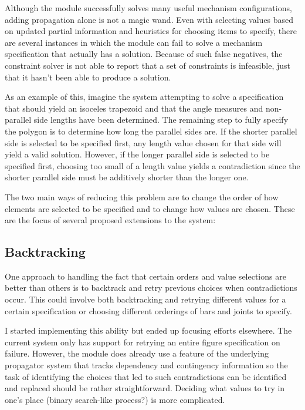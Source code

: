 Although the module successfully solves many useful mechanism
configurations, adding propagation alone is not a magic wand. Even
with selecting values based on updated partial information and
heuristics for choosing items to specify, there are several instances
in which the module can fail to solve a mechanism specification that
actually has a solution. Because of such false negatives, the
constraint solver is not able to report that a set of constraints is
infeasible, just that it hasn't been able to produce a solution.

As an example of this, imagine the system attempting to solve a
specification that should yield an isoceles trapezoid and that the
angle measures and non-parallel side lengths have been determined. The
remaining step to fully specify the polygon is to determine how long
the parallel sides are. If the shorter parallel side is selected to be
specified first, any length value chosen for that side will yield a
valid solution. However, if the longer parallel side is selected to be
specified first, choosing too small of a length value yields a
contradiction since the shorter parallel side must be additively
shorter than the longer one.

The two main ways of reducing this problem are to change the order of
how elements are selected to be specified and to change how values are
chosen. These are the focus of several proposed extensions to the system:

\subsection{Backtracking}

One approach to handling the fact that certain orders and value
selections are better than others is to backtrack and retry previous
choices when contradictions occur. This could involve both
backtracking and retrying different values for a certain specification
or choosing different orderings of bars and joints to specify.

I started implementing this ability but ended up focusing efforts
elsewhere. The current system only has support for retrying an entire
figure specification on failure. However, the module does already use
a feature of the underlying propagator system that tracks dependency
and contingency information so the task of identifying the choices
that led to such contradictions can be identified and replaced should
be rather straightforward. Deciding what values to try in one's place
(binary search-like process?) is more complicated.

